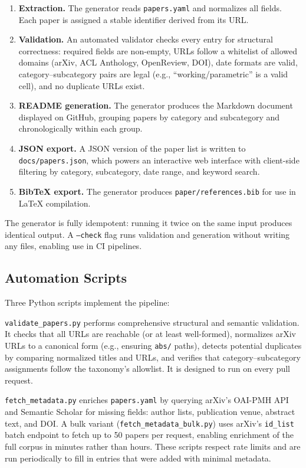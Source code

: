 \begin{enumerate}
  \item \textbf{Extraction.} The generator reads \texttt{papers.yaml} and normalizes all fields. Each paper is assigned a stable identifier derived from its URL.
  \item \textbf{Validation.} An automated validator checks every entry for structural correctness: required fields are non-empty, URLs follow a whitelist of allowed domains (arXiv, ACL Anthology, OpenReview, DOI), date formats are valid, category--subcategory pairs are legal (e.g., ``working/parametric'' is a valid cell), and no duplicate URLs exist.
  \item \textbf{README generation.} The generator produces the Markdown document displayed on GitHub, grouping papers by category and subcategory and chronologically within each group.
  \item \textbf{JSON export.} A JSON version of the paper list is written to \texttt{docs/papers.json}, which powers an interactive web interface with client-side filtering by category, subcategory, date range, and keyword search.
  \item \textbf{BibTeX export.} The generator produces \texttt{paper/references.bib} for use in LaTeX compilation.
\end{enumerate}

The generator is fully idempotent: running it twice on the same input produces identical output. A \texttt{--check} flag runs validation and generation without writing any files, enabling use in CI pipelines.

\subsection{Automation Scripts}

Three Python scripts implement the pipeline:

\texttt{validate\_papers.py} performs comprehensive structural and semantic validation. It checks that all URLs are reachable (or at least well-formed), normalizes arXiv URLs to a canonical form (e.g., ensuring \texttt{abs/} paths), detects potential duplicates by comparing normalized titles and URLs, and verifies that category--subcategory assignments follow the taxonomy's allowlist. It is designed to run on every pull request.

\texttt{fetch\_metadata.py} enriches \texttt{papers.yaml} by querying arXiv's OAI-PMH API and Semantic Scholar for missing fields: author lists, publication venue, abstract text, and DOI. A bulk variant (\texttt{fetch\_metadata\_bulk.py}) uses arXiv's \texttt{id\_list} batch endpoint to fetch up to 50 papers per request, enabling enrichment of the full corpus in minutes rather than hours. These scripts respect rate limits and are run periodically to fill in entries that were added with minimal metadata.


